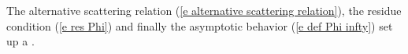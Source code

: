 The alternative scattering relation (\ref{e alternative scattering relation}), the residue condition (\ref{e res Phi}) and finally the asymptotic behavior (\ref{e def Phi infty}) set up a \rh.
